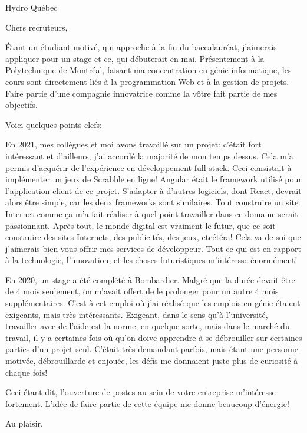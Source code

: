 \documentclass[12pt,french]{letter}
\begin{document}
\pagestyle{headings}

\begin{letter}{Hydro Québec}
\address{Montréal, Canada}

\opening{Chers recruteurs,}


Étant un étudiant motivé, qui approche à la fin du baccalauréat, j’aimerais appliquer pour un stage et ce, qui débuterait en mai.  Présentement à la Polytechnique de Montréal, faisant ma concentration en génie informatique, les cours sont directement liés à la programmation Web et à la gestion de projets.  Faire partie d’une compagnie innovatrice comme la vôtre fait partie de mes objectifs.

Voici quelques points clefs:

En 2021, mes collègues et moi avons travaillé sur un projet: c’était fort intéressant et d’ailleurs, j’ai accordé la majorité de mon temps dessus.  Cela m'a permis d’acquérir de l’expérience en développement full stack.  Ceci consistait à implémenter un jeux de Scrabble en ligne! Angular était le framework utilisé pour l'application client de ce projet.  S'adapter à d’autres logiciels, dont React, devrait alors être simple, car les deux frameworks sont similaires. Tout construire un site Internet comme ça m’a fait réaliser à quel point travailler dans ce domaine serait passionnant.  Après tout, le monde digital est vraiment le futur, que ce soit construire des sites Internets, des publicités, des jeux, etcétéra!  Cela va de soi que j’aimerais bien vous offrir mes services de développeur.  Tout ce qui est en rapport à la technologie, l’innovation, et les choses futuristiques m’intéresse énormément! 

En 2020, un stage a été complété à Bombardier.  Malgré que la durée devait être de 4 mois seulement, on m’avait offert de le prolonger pour un autre 4 mois supplémentaires.  C’est à cet emploi où j’ai réalisé que les emplois en génie étaient exigeants, mais très intéressants. Exigeant, dans le sens qu’à l’université, travailler avec de l'aide est la norme, en quelque sorte, mais dans le marché du travail, il y a certaines fois où qu’on doive apprendre à se débrouiller sur certaines parties d’un projet seul.  C’était très demandant parfois, mais étant une personne motivée, débrouillarde et enjouée, les défis me donnaient juste plus de curiosité à chaque fois!

Ceci étant dit, l'ouverture de postes au sein de votre entreprise m’intéresse fortement.
L’idée de faire partie de cette équipe me donne beaucoup d’énergie!


\signature{Maxime Laroche}

\closing{Au plaisir,}


\end{letter}
\end{document}
